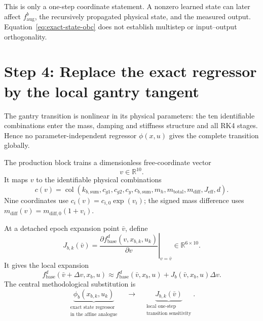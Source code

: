 \documentclass[11pt,a4paper]{article}
\newcommand{\R}{\mathbb{R}}
\newcommand{\col}{\operatorname{col}}
\begin{document}
This is only a one-step coordinate statement.  A nonzero learned state can
later affect \(f_{\mathrm{aug}}^b\), the recursively propagated physical state,
and the measured output.  Equation~\eqref{eq:exact-state-obc} does not establish
multistep or input--output orthogonality.

\section{Step 4: Replace the exact regressor by the local gantry tangent}

The gantry transition is nonlinear in its physical parameters: the ten
identifiable combinations enter the mass, damping and stiffness structure and
all RK4 stages.  Hence no parameter-independent regressor \(\phi(x,u)\) gives
the complete transition globally.

The production block trains a dimensionless free-coordinate vector
\begin{equation}
v\in\R^{10}.
\end{equation}
It maps \(v\) to the identifiable physical combinations
\begin{equation}
c(v)=\col(k_{b,\mathrm{sum}},c_{g1},c_{g2},c_y,c_{b,\mathrm{sum}},m_h,
m_{\mathrm{total}},m_{\mathrm{diff}},J_{\mathrm{eff}},d).
\end{equation}
Nine coordinates use \(c_i(v)=c_{i,0}\exp(v_i)\); the signed mass difference
uses \(m_{\mathrm{diff}}(v)=m_{\mathrm{diff},0}(1+v_i)\).

At a detached epoch expansion point \(\bar v\), define
\begin{equation}
\boxed{
J_{b,k}(\bar v)
=
\left.
\frac{\partial f_{\mathrm{base}}^d(v,x_{b,k},u_k)}{\partial v}
\right|_{v=\bar v}
\in\R^{6\times10}.
}
\label{eq:local-tangent}
\end{equation}
It gives the local expansion
\begin{equation}
f_{\mathrm{base}}^d(\bar v+\Delta v,x_b,u)
\approx
f_{\mathrm{base}}^d(\bar v,x_b,u)
+J_b(\bar v,x_b,u)\Delta v.
\end{equation}
The central methodological substitution is
\begin{equation}
\boxed{
\underbrace{\phi_b(x_{b,k},u_k)}_{\substack{\text{exact state regressor}\\\text{in the affine analogue}}}
\quad\longrightarrow\quad
\underbrace{J_{b,k}(\bar v)}_{\substack{\text{local one-step}\\\text{transition sensitivity}}}.
}
\label{eq:central-substitution}
\end{equation}
\end{document}
